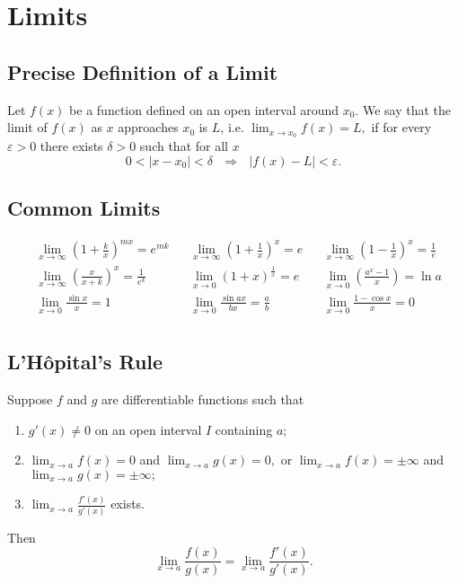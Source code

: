 \section{Limits}
\subsection{Precise Definition of a Limit}
\begin{defn}
	Let $f(x)$ be a function defined on an open interval around $x_0$. We say that the limit of $f(x)$ as $x$ approaches $x_0$ is $L$, i.e.
	$\lim _{ x \to x_{0} }{f(x) } = L,$	if for every $\varepsilon > 0 $ there exists $\delta >0$ such that for all $x$
	$$0 < \left| x - x_{0} \right |<\delta \textrm{ } \Rightarrow \textrm{ } \left |f(x) - L \right| < \varepsilon.$$
\end{defn}
\subsection{Common Limits}
\begin{align*}
&\lim_{x \to \infty}{\left(1 + \frac{k}{x}\right)}^{mx} = e^{mk} & &\lim_{x \to \infty}{\left(1 + \frac{1}{x}\right)}^{x} = e & &\lim_{x \to \infty}{\left(1 - \frac{1}{x}\right)}^{x} = \frac{1}{e}\\
&\lim_{x \to \infty}{\left(\frac{x}{x+k}\right)}^{x} = \frac{1}{e^k} & &\lim_{x \to 0}{\left(1 + x\right)}^{\frac{1}{x}} = e & &\lim_{x \to 0}{\left(\frac{a^x - 1}{x}\right)} = \ln a \\
&\lim_{x \to 0}{\frac{\sin x}{x}} = 1 & &\lim_{x \to 0}{\frac{\sin{ax}}{bx}} = \frac{a}{b} & &\lim_{x \to 0}{\frac{1 - \cos x}{x}} = 0 \\
\end{align*}

\subsection{L'H\^{o}pital's Rule}
\begin{thrm}
	Suppose $f$ and $g$ are differentiable functions such that
\begin{enumerate}
	\item $g'(x) \neq 0$ on an open interval  $I$ containing $a;$
	\item $\lim_{x\to a} f(x) = 0$ and $\lim_{x\to a} g(x) = 0,$ or $\lim_{x\to a} f(x) = \pm \infty$ and $\lim_{x\to a} g(x) = \pm \infty;$
	\item $\lim_{x\to a} \frac{f'(x)}{g'(x)}$ exists.
\end{enumerate}
	Then
	$$\lim_{x\to a} \frac{f(x)}{g(x)} = \lim_{x\to a} \frac{f'(x)}{g'(x)}.$$
\end{thrm}
